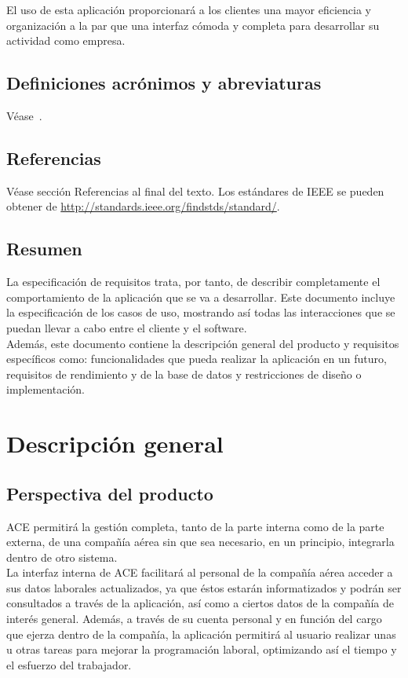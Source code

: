 \documentclass[11pt, a4paper, twoside, titlepage]{article}
\begin{document}
			El uso de esta aplicación proporcionará a los clientes una mayor eficiencia y organización a la par que una interfaz cómoda y completa para desarrollar su actividad como empresa. 
			
		\subsection{Definiciones acrónimos y abreviaturas}
			Véase~.
		\subsection{Referencias}
			Véase sección Referencias al final del texto. Los estándares de IEEE se pueden obtener de \url{http://standards.ieee.org/findstds/standard/}.
		\subsection{Resumen}
			La especificación de requisitos trata, por tanto, de describir completamente el comportamiento de la aplicación que se va a desarrollar. Este documento incluye la especificación de los casos de uso, mostrando así todas las interacciones que se puedan llevar a cabo entre el cliente y el software. \\

			Además, este documento contiene la descripción general del producto y requisitos específicos como: funcionalidades que pueda realizar la aplicación en un futuro, requisitos de rendimiento y de la base de datos y restricciones de diseño o implementación.
			
	\section{Descripción general}
		\subsection{Perspectiva del producto}
			ACE permitirá la gestión completa, tanto de la parte interna como de la parte externa, de una compañía aérea sin que sea necesario, en un principio, integrarla dentro de otro sistema. \\
			
			La interfaz interna de ACE facilitará al personal de la compañía aérea acceder a sus datos laborales actualizados, ya que éstos estarán informatizados y podrán ser consultados a través de la aplicación, así como a ciertos datos de la compañía de interés general. Además, a través de su cuenta personal y en función del cargo que ejerza dentro de la compañía, la aplicación permitirá al usuario realizar unas u otras tareas para mejorar la programación laboral, optimizando así el tiempo y el esfuerzo del trabajador. \\
			
\end{document}
